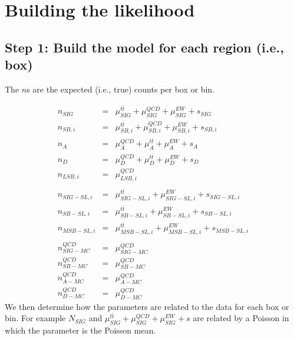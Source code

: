 \documentclass[11pt]{article}
\begin{document}
    
    
    
    
    
    
    
    
    
    
    \section{Building the likelihood}
    
    \subsection{Step 1: Build the model for each region (i.e., box)}
    
    The $n$s are the expected (i.e., true) counts per box or bin.
    
    \begin{eqnarray}
    n_{SIG} & = & \mu_{SIG}^{t\bar{t}} + \mu_{SIG}^{QCD} + \mu_{SIG}^{EW} + s_{SIG} \\
    n_{SB,i} & = & \mu_{SB,i}^{t\bar{t}} + \mu_{SB,i}^{QCD} + \mu_{SB,i}^{EW} + s_{SB,i} \\
    n_{A} & = & \mu_{A}^{QCD} + \mu_{A}^{t\bar t} + \mu_{A}^{EW} + s_{A}\\
    n_{D} & = & \mu_{D}^{QCD} + \mu_{D}^{t\bar t} + \mu_{D}^{EW} + s_{D}\\
    n_{LSB,i} & = & \mu_{LSB,i}^{QCD} \\ 
    \nonumber \\
    n_{SIG-SL,i} & = & \mu_{SIG-SL,i}^{t\bar{t}} + \mu_{SIG-SL,i}^{EW} + s_{SIG-SL,i} \\  
    n_{SB-SL,i} & = & \mu_{SB-SL,i}^{t\bar{t}} + \mu_{SB-SL,i}^{EW} + s_{SB-SL,i} \\
    n_{MSB-SL,i} & = & \mu_{MSB-SL,i}^{t\bar{t}} + \mu_{MSB-SL,i}^{EW} + s_{MSB-SL,i}  \\
    \nonumber \\
    n_{SIG-MC}^{QCD} & = & \mu_{SIG-MC}^{QCD} \\
    n_{SB-MC}^{QCD} & = & \mu_{SB-MC}^{QCD} \\
    n_{A-MC}^{QCD} & = & \mu_{A-MC}^{QCD} \\
    n_{D-MC}^{QCD} & = & \mu_{D-MC}^{QCD}
    \end{eqnarray}
    \noindent
    We then determine how the parameters are related to the data for each box or bin.  For example $N_{SIG}$ and $\mu_{SIG}^{t\bar{t}} + \mu_{SIG}^{QCD} + \mu_{SIG}^{EW} + s$ are related by a Poisson in which the parameter is the Poisson mean.
    
\end{document}

